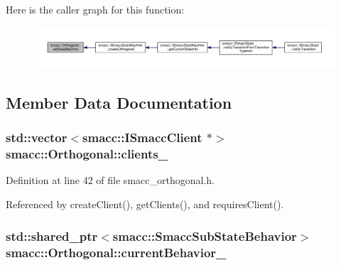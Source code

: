 Here is the caller graph for this function\+:
\nopagebreak
\begin{figure}[H]
\begin{center}
\leavevmode
\includegraphics[width=350pt]{classsmacc_1_1Orthogonal_a05f65c01344a6c8593f7f88c0ca19654_icgraph}
\end{center}
\end{figure}




\subsection{Member Data Documentation}
\subsubsection[{\texorpdfstring{clients\+\_\+}{clients_}}]{\setlength{\rightskip}{0pt plus 5cm}std\+::vector$<${\bf smacc\+::\+I\+Smacc\+Client} $\ast$$>$ smacc\+::\+Orthogonal\+::clients\+\_\+\hspace{0.3cm}{\ttfamily [private]}}\hypertarget{classsmacc_1_1Orthogonal_acdcb1b5dca84a6521ef25f07212afa5e}{}\label{classsmacc_1_1Orthogonal_acdcb1b5dca84a6521ef25f07212afa5e}


Definition at line 42 of file smacc\+\_\+orthogonal.\+h.



Referenced by create\+Client(), get\+Clients(), and requires\+Client().

\subsubsection[{\texorpdfstring{current\+Behavior\+\_\+}{currentBehavior_}}]{\setlength{\rightskip}{0pt plus 5cm}std\+::shared\+\_\+ptr$<${\bf smacc\+::\+Smacc\+Sub\+State\+Behavior}$>$ smacc\+::\+Orthogonal\+::current\+Behavior\+\_\+\hspace{0.3cm}{\ttfamily [private]}}\hypertarget{classsmacc_1_1Orthogonal_a4b393107861122834613734f499ccaeb}{}\label{classsmacc_1_1Orthogonal_a4b393107861122834613734f499ccaeb}



